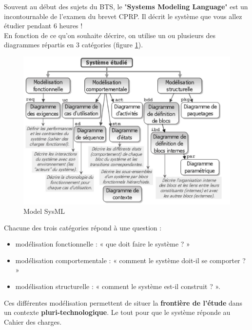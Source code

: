 \documentclass[
	11pt, %
	fleqn, %
	a4paper, %
]{LegrandOrangeBook}
\begin{document}
Souvent au début des sujets du BTS, le "\textbf{Systems Modeling Language}" est un incontournable de l'examen du brevet CPRP. Il décrit le système que vous allez étudier pendant 6 heures !\\
En fonction de ce qu'on souhaite décrire, on utilise un ou plusieurs des diagrammes répartis en 3 catégories (figure \ref{Sys1}).


\begin{figure}[H] %
	\centering %
	\includegraphics[width=1\textwidth]{Images/Sys1.JPG} %
	\caption{Model SysML}
	\label{Sys1} %
\end{figure}



Chacune des trois catégories répond à une question :
\begin{itemize}
    \item modélisation fonctionnelle : « que doit faire le système ? »
    \item modélisation comportementale : « comment le système doit-il se comporter ? »
    \item modélisation structurelle : « comment le système est-il construit ? ».\\
\end{itemize}


Ces différentes modélisation permettent de situer la \textbf{frontière de l’étude} dans un contexte \textbf{pluri-technologique}. Le tout pour que le système réponde au Cahier des charges.\\
\end{document}
